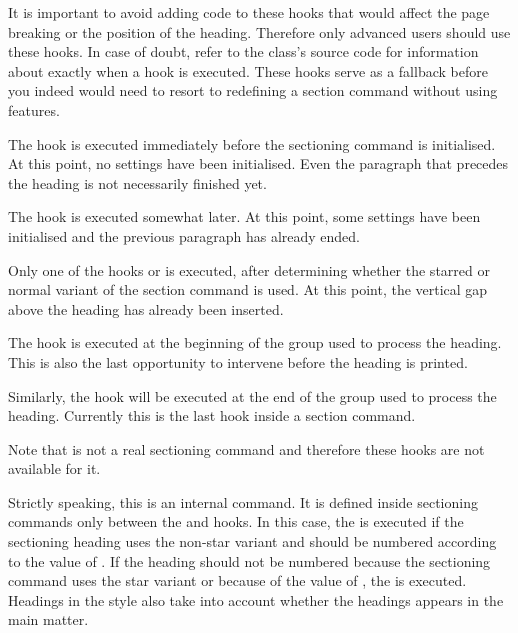 It is important to avoid adding code to these hooks that
would affect the page breaking or the position of the heading. Therefore only
advanced users should use these hooks. In case of doubt, refer to the class's
source code for information about exactly when a hook is executed. These hooks
serve as a fallback before you indeed would need to resort to redefining
a section command without using \KOMAScript{} features.

The hook
 is executed immediately before the
sectioning command is initialised. At this point, no settings have been
initialised. Even the paragraph that precedes the heading is not
necessarily finished yet.

The hook
 is executed somewhat later. At this
point, some settings have been initialised and the previous paragraph has
already ended.

Only one of the hooks
 or
 is executed, after determining
whether the starred or normal variant of the section command is used. At this
point, the vertical gap above the heading has already been inserted.

The hook
 is executed at the beginning of
the group used to process the heading. This is also the last opportunity to
intervene before the heading is printed.

Similarly, the hook
 will be executed at the end of the
group used to process the heading. Currently this is the last hook inside
a section command.

Note that 
 is not a real sectioning command and therefore
these hooks are not available for it.%
\EndIndexGroup

\begin{Declaration}
\end{Declaration}
Strictly speaking, this is an internal command. It is defined
inside sectioning commands only between the 
and  hooks. In this case, the
 is executed if the sectioning heading uses the non-star
variant and should be numbered according to the value of
. If the heading should not be numbered
because the sectioning command uses the star variant or because of the value
of , the  is executed.
Headings in the  style also take into account whether
the headings appears in the main matter.

